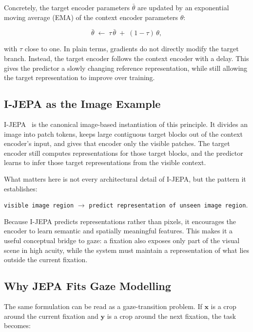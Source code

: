 \documentclass[12pt,a4paper]{article}
\begin{document}
Concretely, the target encoder parameters $\bar\theta$ are updated by an
exponential moving average (EMA) of the context encoder parameters $\theta$:

\begin{equation}
  \bar\theta \;\leftarrow\; \tau\,\bar\theta \;+\; (1-\tau)\,\theta,
  \label{eq:ema}
\end{equation}

with $\tau$ close to one. In plain terms, gradients do not directly modify the
target branch. Instead, the target encoder follows the context encoder with a
delay. This gives the predictor a slowly changing reference representation,
while still allowing the target representation to improve over training.

\subsection{I-JEPA as the Image Example}
\label{sec:ijepa}

I-JEPA~\cite{assran2023ijepa} is the canonical image-based instantiation of
this principle. It divides an image into patch tokens, keeps large contiguous
target blocks out of the context encoder's input, and gives that encoder only
the visible patches. The target encoder still computes representations for
those target blocks, and the predictor learns to infer those target
representations from the visible context.

What matters here is not every architectural detail of I-JEPA, but the pattern
it establishes:

\begin{center}
\texttt{visible image region}
$\rightarrow$
\texttt{predict representation of unseen image region}.
\end{center}

Because I-JEPA predicts representations rather than pixels, it encourages the
encoder to learn semantic and spatially meaningful features. This makes it a
useful conceptual bridge to gaze: a fixation also exposes only part of the
visual scene in high acuity, while the system must maintain a representation of
what lies outside the current fixation.

\subsection{Why JEPA Fits Gaze Modelling}
\label{subsec:ijepa-gaze-link}

The same formulation can be read as a gaze-transition problem. If
$\mathbf{x}$ is a crop around the current fixation and $\mathbf{y}$ is a crop
around the next fixation, the task becomes:
\end{document}
